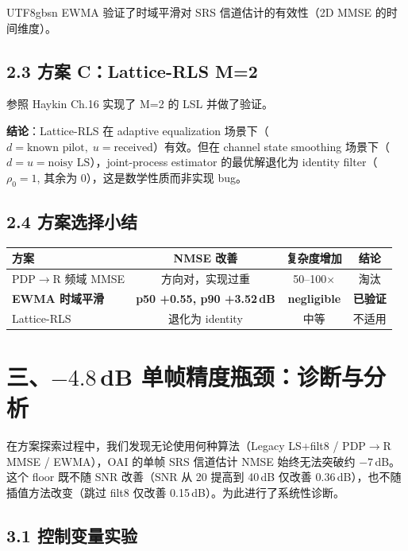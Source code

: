 \documentclass[11pt,a4paper]{article}
\begin{document}
\begin{CJK}{UTF8}{gbsn}
EWMA 验证了时域平滑对 SRS 信道估计的有效性（2D MMSE 的时间维度）。

\subsection{2.3 方案 C：Lattice-RLS M=2}

参照 Haykin Ch.16 实现了 M=2 的 LSL 并做了验证。

\textbf{结论}：Lattice-RLS 在 adaptive equalization 场景下（$d = \text{known pilot},\; u = \text{received}$）有效。但在 channel state smoothing 场景下（$d = u = \text{noisy LS}$），joint-process estimator 的最优解退化为 identity filter（$\rho_0=1$, 其余为 0），这是数学性质而非实现 bug。

\subsection{2.4 方案选择小结}

\begin{table}[h]\centering
\begin{tabular}{lccc}
\toprule
方案 & NMSE 改善 & 复杂度增加 & 结论 \\
\midrule
PDP$\to$R 频域 MMSE & 方向对，实现过重 & 50--100$\times$ & 淘汰 \\
\textbf{EWMA 时域平滑} & \textbf{p50 +0.55, p90 +3.52\,dB} & \textbf{negligible} & \textbf{已验证} \\
Lattice-RLS & 退化为 identity & 中等 & 不适用 \\
\bottomrule
\end{tabular}
\end{table}

\section{三、$-4.8$\,dB 单帧精度瓶颈：诊断与分析}

在方案探索过程中，我们发现无论使用何种算法（Legacy LS+filt8 / PDP$\to$R MMSE / EWMA），OAI 的单帧 SRS 信道估计 NMSE 始终无法突破约 $-7$\,dB。这个 floor 既不随 SNR 改善（SNR 从 20 提高到 40\,dB 仅改善 0.36\,dB），也不随插值方法改变（跳过 filt8 仅改善 0.15\,dB）。为此进行了系统性诊断。

\subsection{3.1 控制变量实验}


\end{CJK}
\end{document}
